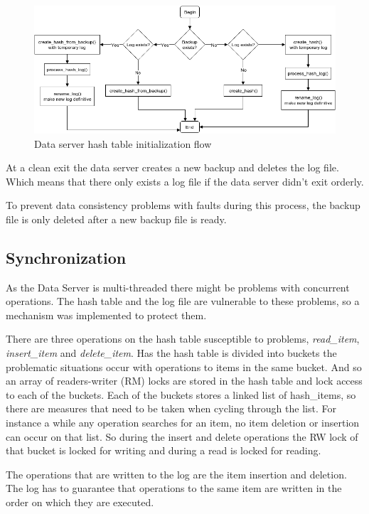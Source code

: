 \documentclass[12pt]{article} %
\begin{document}
\begin{figure}[H]
\centering
\includegraphics[width=\textwidth]{./Pictures/BackupLogFlow.png}
\caption{Data server hash table initialization flow}\label{fig:BackupLogFlow}
\end{figure}

At a clean exit the data server creates a new backup and deletes the log file.
Which means that there only exists a log file if the data server didn't exit orderly.

To prevent data consistency problems with faults during this process, the
backup file is only deleted after a new backup file is ready.

\subsection{Synchronization}
\label{sub:Synchronization}

As the Data Server is multi-threaded there might be problems with concurrent operations.
The hash table and the log file are vulnerable to these problems, so a mechanism was implemented to protect them.

There are three operations on the hash table susceptible to problems, \emph{read\_item}, \emph{insert\_item} and \emph{delete\_item}.
Has the hash table is divided into buckets the problematic situations occur with operations to items in the same bucket.
And so an array of readers-writer (RM) locks are stored in the hash table and lock access to each of the buckets.
Each of the buckets stores a linked list of hash\_items, so there are measures that need to be taken when cycling through the list.
For instance a while any operation searches for an item, no item deletion or insertion can occur on that list. So during the insert and delete operations the RW lock of that bucket is locked for writing and during a read is locked for reading.

The operations that are written to the log are the item insertion and deletion.
The log has to guarantee that operations to the same item are written in the order on which they are executed.
\end{document}
